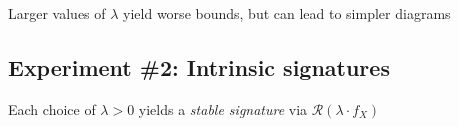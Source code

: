 \documentclass[
  letterpaper,
  DIV=11,
  numbers=noendperiod,
  oneside]{scrartcl}
\begin{document}
\begin{figure}

\begin{minipage}[t]{0.25\linewidth}

{\centering 


}

\end{minipage}%
%
\begin{minipage}[t]{0.25\linewidth}

{\centering 


}

\end{minipage}%
%
\begin{minipage}[t]{0.25\linewidth}

{\centering 


}

\end{minipage}%
%
\begin{minipage}[t]{0.25\linewidth}

{\centering 


}

\end{minipage}%

\end{figure}

Larger values of \(\lambda\) yield worse bounds, but can lead to simpler
diagrams

\hypertarget{experiment-2-intrinsic-signatures-7}{%
\subsection{Experiment \#2: Intrinsic
signatures}\label{experiment-2-intrinsic-signatures-7}}

Each choice of \(\lambda > 0\) yields a \emph{stable signature} via
\(\mathcal{R}(\lambda \cdot f_X)\)
\end{document}
